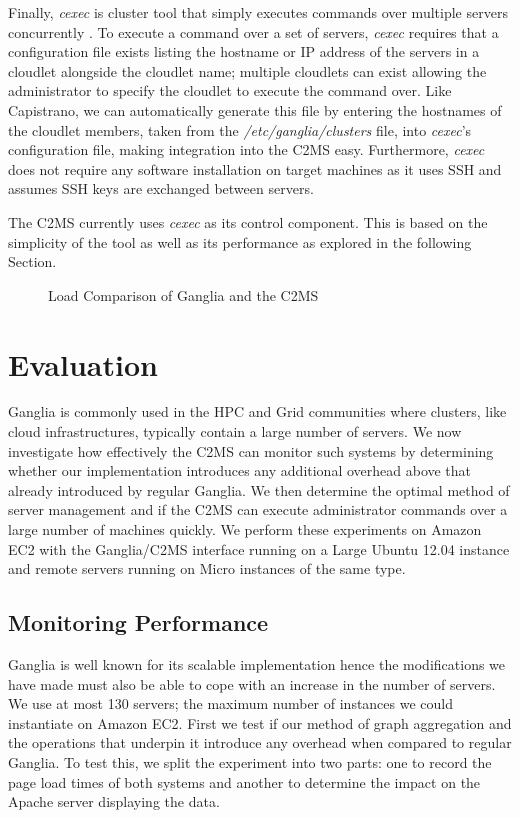 \documentclass[10pt, conference, compsocconf]{IEEEtran}
\begin{document}
Finally, \textit{cexec} is cluster tool that simply executes commands over multiple servers concurrently \cite{PeterKacsuk2004}. To execute a command over a set of servers, \textit{cexec} requires that a configuration file exists listing the hostname or IP address of the servers in a cloudlet alongside the cloudlet name; multiple cloudlets can exist allowing the administrator to specify the cloudlet to execute the command over. Like Capistrano, we can automatically generate this file by entering the hostnames of the cloudlet members, taken from the \textit{/etc/ganglia/clusters} file, into \textit{cexec}'s configuration file, making integration into the C2MS easy. Furthermore, \textit{cexec} does not require any software installation on target machines as it uses SSH and assumes SSH keys are exchanged between servers.

The C2MS currently uses \textit{cexec} as its control component. This is based on the simplicity of the tool as well as its performance as explored in the following Section.

\begin{figure*}
\centering
{}
\caption{Load Comparison of Ganglia and the C2MS}
\end{figure*}

\section{Evaluation}
Ganglia is commonly used in the HPC and Grid communities where clusters, like cloud infrastructures, typically contain a large number of servers. We now investigate how effectively the C2MS can monitor such systems by determining whether our implementation introduces any additional overhead above that already introduced by regular Ganglia. We then determine the optimal method of server management and if the C2MS can execute administrator commands over a large number of machines quickly. We perform these experiments on Amazon EC2 with the Ganglia/C2MS interface running on a Large Ubuntu 12.04 instance and remote servers running on Micro instances of the same type.

\subsection{Monitoring Performance}
Ganglia is well known for its scalable implementation hence the modifications we have made must also be able to cope with an increase in the number of servers. We use at most 130 servers; the maximum number of instances we could instantiate on Amazon EC2. First we test if our method of graph aggregation and the operations that underpin it introduce any overhead when compared to regular Ganglia. To test this, we split the experiment into two parts: one to record the page load times of both systems and another to determine the impact on the Apache server displaying the data. 
\end{document}
